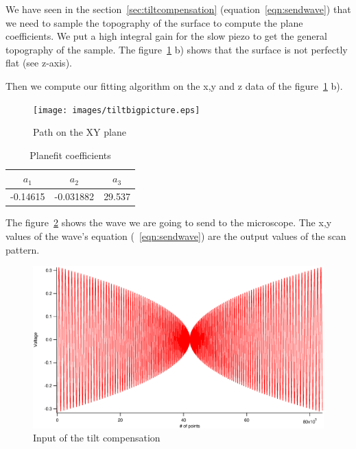 We have seen in the section~\ref{sec:tiltcompensation} (equation~\ref{eqn:sendwave}) that we need to sample the topography of the surface to compute the plane coefficients. We put a high integral gain for the slow piezo to get the general topography of the sample. The figure~\ref{fig:tiltwaves} b) shows that the surface is not perfectly flat (see z-axis).

Then we compute our fitting algorithm on the x,y and z data of the figure~\ref{fig:tiltwaves} b).


\begin{figure}[!ht]
\centering
\texttt{[image: images/tiltbigpicture.eps]}
\caption{Path on the XY plane}
\label{fig:tiltwaves}
\end{figure}

\begin{table}[H]

\centering %
\begin{tabular}{c c c} %
\hline\hline %
$a_1$ & $a_2$ & $a_3$ \\ [0.5ex] %
\hline %
-0.14615  & -0.031882 & 29.537 \\[1ex]
\hline %
\end{tabular}
\caption{Planefit coefficients} %
\label{table:planefit} %
\end{table}

The figure~\ref{fig:spiralztiltout} shows the wave we are going to send to the microscope. The x,y values of the wave's equation (~\ref{eqn:sendwave}) are the output values of the scan pattern.

\begin{figure}[H]
  \centering
  \includegraphics[scale=0.3]{images/spiralztiltout.eps}
    \caption{Input of the tilt compensation}
  \label{fig:spiralztiltout}
\end{figure}

